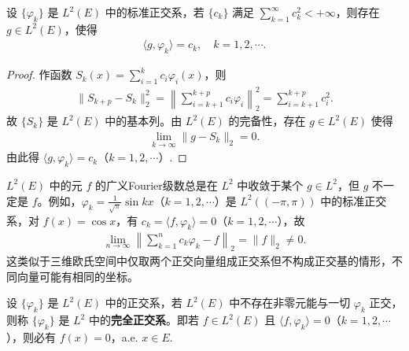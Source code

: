 \documentclass[../../main.tex]{subfiles}%
\begin{document}
\begin{theorem}\label{theorem:实变函数--Riesz-Fischer定理原始形式}
设 $\{\varphi_k\}$ 是 $L^2(E)$ 中的标准正交系，若 $\{c_k\}$ 满足 $\sum\limits_{k=1}^\infty c_k^2 < +\infty$，则存在 $g \in L^2(E)$，使得
\begin{align*}
\langle g, \varphi_k \rangle = c_k, \quad k=1,2,\cdots.
\end{align*}
\end{theorem}
\begin{proof}
作函数 $S_k(x) = \sum\limits_{i=1}^k c_i \varphi_i(x)$，则
\begin{align*}
\|S_{k+p} - S_k\|_2^2 = \left\| \sum_{i=k+1}^{k+p} c_i \varphi_i \right\|_2^2 = \sum_{i=k+1}^{k+p} c_i^2.
\end{align*}
故 $\{S_k\}$ 是 $L^2(E)$ 中的基本列。由 $L^2(E)$ 的完备性，存在 $g \in L^2(E)$ 使得
\begin{align*}
\lim_{k \to \infty} \|g - S_k\|_2 = 0.
\end{align*}
由此得 $\langle g, \varphi_k \rangle = c_k$（$k=1,2,\cdots$）.
\end{proof}

\begin{remark}
$L^2(E)$ 中的元 $f$ 的广义Fourier级数总是在 $L^2$ 中收敛于某个 $g \in L^2$，但 $g$ 不一定是 $f$。例如，$\varphi_k = \frac{1}{\sqrt{\pi}} \sin kx$（$k=1,2,\cdots$）是 $L^2((-\pi, \pi))$ 中的标准正交系，对 $f(x) = \cos x$，有 $c_k = \langle f, \varphi_k \rangle = 0$（$k=1,2,\cdots$），故
\begin{align*}
\lim_{n \to \infty} \left\| \sum_{k=1}^n c_k \varphi_k - f \right\|_2 = \|f\|_2 \neq 0.
\end{align*}
这类似于三维欧氏空间中仅取两个正交向量组成正交系但不构成正交基的情形，不同向量可能有相同的坐标。
\end{remark}

\begin{definition}[完全正交系]
设 $\{\varphi_k\}$ 是 $L^2(E)$ 中的正交系，若 $L^2(E)$ 中不存在非零元能与一切 $\varphi_k$ 正交，则称 $\{\varphi_k\}$ 是 $L^2$ 中的\textbf{完全正交系}。即若 $f \in L^2(E)$ 且 $\langle f, \varphi_k \rangle = 0$（$k=1,2,\cdots$），则必有 $f(x) = 0$，a.e. $x \in E$.
\end{definition}
\end{document}
